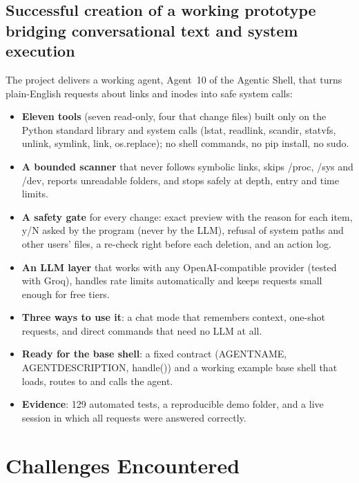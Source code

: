 \documentclass[12pt,a4paper]{article}
\DeclareRobustCommand{\code}[1]{{\ttfamily\renewcommand{\_}{\textunderscore\allowbreak}#1}}
\begin{document}
\subsection{Successful creation of a working prototype bridging conversational text and system execution}
The project delivers a working agent, Agent~10 of the Agentic Shell, that turns plain-English
requests about links and inodes into safe system calls:
\begin{itemize}
  \item \textbf{Eleven tools} (seven read-only, four that change files) built only on the
        Python standard library and system calls (\code{lstat}, \code{readlink}, \code{scandir},
        \code{statvfs}, \code{unlink}, \code{symlink}, \code{link}, \code{os.replace}); no shell
        commands, no \code{pip install}, no \code{sudo}.
  \item \textbf{A bounded scanner} that never follows symbolic links, skips \code{/proc},
        \code{/sys} and \code{/dev}, reports unreadable folders, and stops safely at depth, entry
        and time limits.
  \item \textbf{A safety gate} for every change: exact preview with the reason for each item,
        y/N asked by the program (never by the LLM), refusal of system paths and other users'
        files, a re-check right before each deletion, and an action log.
  \item \textbf{An LLM layer} that works with any OpenAI-compatible provider (tested with Groq),
        handles rate limits automatically and keeps requests small enough for free tiers.
  \item \textbf{Three ways to use it}: a chat mode that remembers context, one-shot requests, and
        direct commands that need no LLM at all.
  \item \textbf{Ready for the base shell}: a fixed contract (\code{AGENT\_NAME},
        \code{AGENT\_DESCRIPTION}, \code{handle()}) and a working example base shell that loads,
        routes to and calls the agent.
  \item \textbf{Evidence}: 129 automated tests, a reproducible demo folder, and a live session in
        which all requests were answered correctly.
\end{itemize}

\section{Challenges Encountered}
\end{document}
